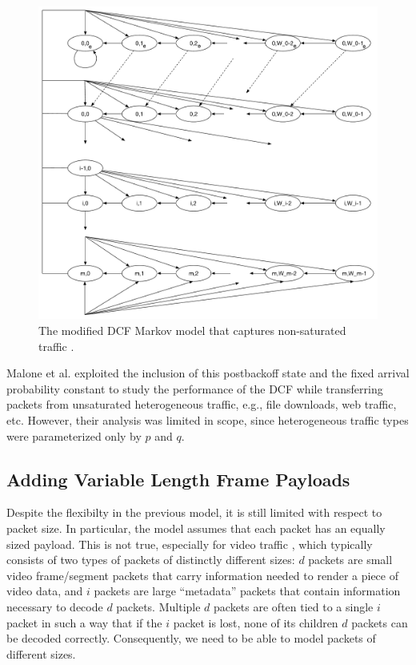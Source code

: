 \documentclass{llncs}
\begin{document}
\begin{figure}
\begin{center}
\includegraphics[scale=0.35]{../../sketches/dcf_model_nonsaturated.pdf}
\caption{The modified DCF Markov model that captures non-saturated traffic \cite{dcf-unsaturated}.}
\label{fig:dcf_model_nonsaturated}
\end{center}
\end{figure}

Malone et al. \cite{dcf-nonsaturated} exploited the inclusion of this postbackoff state and the fixed arrival probability constant to study the performance of the DCF while transferring packets from unsaturated heterogeneous traffic, e.g., file downloads, web traffic, etc. However, their analysis was limited in scope, since heterogeneous traffic types were parameterized only by $p$ and $q$.

\subsection{Adding Variable Length Frame Payloads}
Despite the flexibilty in the previous model, it is still limited with respect to packet size. In particular, the model assumes that each packet has an equally sized payload. This is not true, especially for video traffic \cite{badia2010markov}, which typically consists of two types of packets of distinctly different sizes: $d$ packets are small video frame/segment packets that carry information needed to render a piece of video data, and $i$ packets are large ``metadata'' packets that contain information necessary to decode $d$ packets. Multiple $d$ packets are often tied to a single $i$ packet in such a way that if the $i$ packet is lost, none of its children $d$ packets can be decoded correctly. Consequently, we need to be able to model packets of different sizes. 
\end{document}
